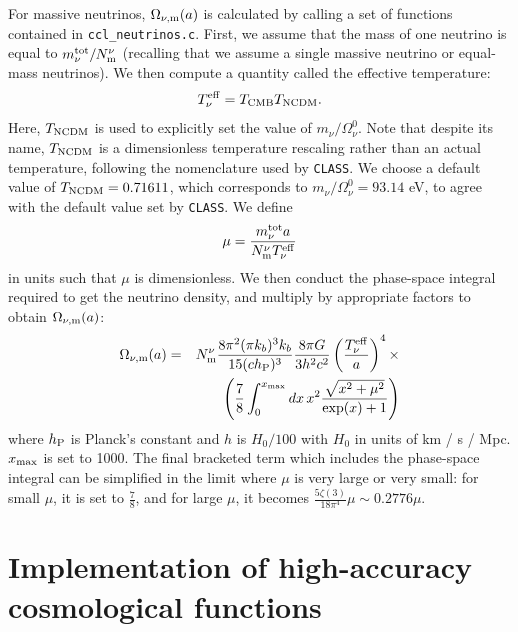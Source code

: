 \documentclass[\docopts]{\docclass}
\begin{document}
For massive neutrinos, $\Omega_{\nu, {\rm m}}(a)$ is calculated by calling a set of functions contained in {\tt ccl\_neutrinos.c}. First, we assume that the mass of one neutrino is equal to $m_{\nu}^{\rm tot} / N_{\rm m}^{\nu}$ (recalling that we assume a single massive neutrino or equal-mass neutrinos). We then compute a quantity called the effective temperature:
\begin{equation}
T_{\nu}^{\rm eff} = T_{\rm CMB} T_{\rm NCDM}.
\label{Tnueff}
\end{equation}
Here, $T_{\rm NCDM}$ is used to explicitly set the value of $m_{\nu} / \Omega_{\nu}^0$. Note that despite its name, $T_{\rm NCDM}$ is a dimensionless temperature rescaling rather than an actual temperature, following the nomenclature used by {\tt CLASS}. We choose a default value of $T_{\rm NCDM} = 0.71611$, which corresponds to $m_{\nu} / \Omega_{\nu}^0 = 93.14$ eV, to agree with the default value set by {\tt CLASS}. We define
\begin{equation}
\mu = \frac{m_{\nu}^{\rm tot}a}{N_{\rm m}^\nu T_{\nu}^{\rm eff}}
\label{mnuOT}
\end{equation}
in units such that $\mu$ is dimensionless. We then conduct the phase-space integral required to get the neutrino density, and multiply by appropriate factors to obtain $\Omega_{\nu, {\rm m}}(a)$:
\begin{eqnarray}
  \Omega_{\nu, {\rm m}}(a) &=& N_{\rm m}^\nu \frac{8 \pi^2(\pi k_b )^3 k_b}{15(c h_{\rm P})^3} \frac{8 \pi G}{3h^2c^2} \left(\frac{T_{\nu}^{\rm eff}}{a}\right)^4 \times\nonumber\\
  && \left(\frac{7}{8}\int_0^{x_{\rm max}} dx \, x^2 \frac{\sqrt{x^2 + \mu^2}}{\exp(x) + 1}\right)
\label{Omnu}
\end{eqnarray}
where $h_{\rm P}$ is Planck's constant and $h$ is $H_0/100$ with $H_0$ in units of km / s / Mpc. $x_{\rm max}$ is set to 1000. The final bracketed term which includes the phase-space integral can be simplified in the limit where $\mu$ is very large or very small: for small $\mu$, it is set to $\frac{7}{8}$, and for large $\mu$, it becomes $\frac{5\zeta(3)}{18\pi^4}\mu\sim 0.2776\mu$.

\section{Implementation of high-accuracy cosmological functions}

\end{document}
